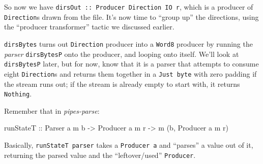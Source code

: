\documentclass[]{article}
\newenvironment{Shaded}{}{}
\newcommand{\KeywordTok}[1]{\textcolor[rgb]{0.00,0.44,0.13}{\textbf{#1}}}
\newcommand{\DataTypeTok}[1]{\textcolor[rgb]{0.56,0.13,0.00}{#1}}
\newcommand{\CommentTok}[1]{\textcolor[rgb]{0.38,0.63,0.69}{\textit{#1}}}
\newcommand{\OtherTok}[1]{\textcolor[rgb]{0.00,0.44,0.13}{#1}}
\newcommand{\FunctionTok}[1]{\textcolor[rgb]{0.02,0.16,0.49}{#1}}
\newcommand{\NormalTok}[1]{#1}
\begin{document}
So now we have \texttt{dirsOut\ ::\ Producer\ Direction\ IO\ r}, which is a
producer of \texttt{Direction}s drawn from the file. It's now time to ``group
up'' the directions, using the ``producer transformer'' tactic we discussed
earlier.

\begin{Shaded}
\end{Shaded}

\texttt{dirsBytes} turns out \texttt{Direction} producer into a \texttt{Word8}
producer by running the \emph{parser} \texttt{dirsBytesP} onto the producer, and
looping onto itself. We'll look at \texttt{dirsBytesP} later, but for now, know
that it is a parser that attempts to consume eight \texttt{Direction}s and
returns them together in a \texttt{Just\ byte} with zero padding if the stream
runs out; if the stream is already empty to start with, it returns
\texttt{Nothing}.

Remember that in \emph{pipes-parse}:

\begin{Shaded}
\begin{Highlighting}[]
\OtherTok{runStateT ::} \DataTypeTok{Parser}\NormalTok{ a m b }\OtherTok{->} \DataTypeTok{Producer}\NormalTok{ a m r }\OtherTok{->}\NormalTok{ m (b, }\DataTypeTok{Producer}\NormalTok{ a m r)}
\end{Highlighting}
\end{Shaded}

Basically, \texttt{runStateT\ parser} takes a \texttt{Producer\ a} and
``parses'' a value out of it, returning the parsed value and the
``leftover/used'' \texttt{Producer}.
\end{document}
